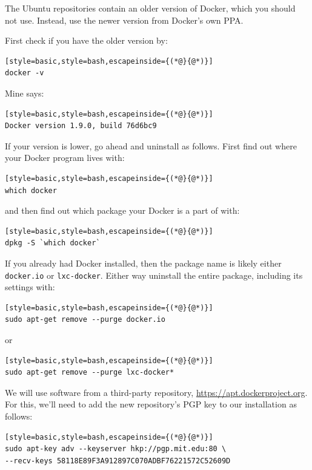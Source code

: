 \documentclass[12pt, a4paper, twoside, openany, titlepage]{book}
\begin{document}
The Ubuntu repositories contain an older version of Docker, which you should not use. Instead, use the newer version from Docker's own PPA.

First check if you have the older version by:
\begin{lstlisting}[style=basic,style=bash,escapeinside={(*@}{@*)}]
docker -v
\end{lstlisting}
Mine says:
\begin{lstlisting}[style=basic,style=bash,escapeinside={(*@}{@*)}]
Docker version 1.9.0, build 76d6bc9
\end{lstlisting}

If your version is lower, go ahead and uninstall as follows. First find out where your Docker program lives with:
\begin{lstlisting}[style=basic,style=bash,escapeinside={(*@}{@*)}]
which docker
\end{lstlisting}

and then find out which package your Docker is a part of with:
\begin{lstlisting}[style=basic,style=bash,escapeinside={(*@}{@*)}]
dpkg -S `which docker`
\end{lstlisting}

If you already had Docker installed, then the package name is likely either \texttt{docker.io} or \texttt{lxc-docker}. Either way uninstall the entire package, including its settings with:
\begin{lstlisting}[style=basic,style=bash,escapeinside={(*@}{@*)}]
sudo apt-get remove --purge docker.io
\end{lstlisting}
or
\begin{lstlisting}[style=basic,style=bash,escapeinside={(*@}{@*)}]
sudo apt-get remove --purge lxc-docker*
\end{lstlisting}

We will use software from a third-party repository, \url{https://apt.dockerproject.org}. For this, we'll need to add the new repository's PGP key to our installation as follows:
\begin{lstlisting}[style=basic,style=bash,escapeinside={(*@}{@*)}]
sudo apt-key adv --keyserver hkp://pgp.mit.edu:80 \
--recv-keys 58118E89F3A912897C070ADBF76221572C52609D
\end{lstlisting}
\end{document}
